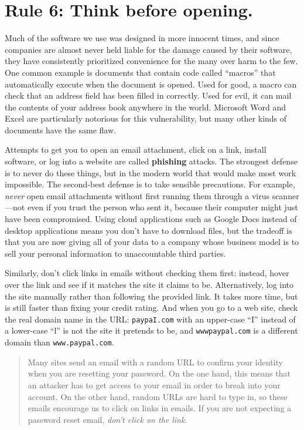 \documentclass[10pt,letterpaper]{article}
\newcommand{\rulemajor}[1]{\section*{#1}}
\begin{document}
\rulemajor{Rule 6: Think before opening.}

Much of the software we use was designed in more innocent times,
and since companies are almost never held liable for the damage caused by their software,
they have consistently prioritized convenience for the many over harm to the few.
One common example is documents that contain code called ``macros''
that automatically execute when the document is opened.
Used for good,
a macro can check that an address field has been filled in correctly.
Used for evil,
it can mail the contents of your address book anywhere in the world.
Microsoft Word and Excel are particularly notorious for this vulnerability,
but many other kinds of documents have the same flaw.

Attempts to get you to open an email attachment,
click on a link,
install software,
or log into a website are called \textbf{phishing} attacks.
The strongest defense is to never do these things,
but in the modern world that would make most work impossible.
The second-best defense is to take sensible precautions.
For example,
\emph{never} open email attachments without first running them through a virus scanner---not even
if you trust the person who sent it,
because their computer might just have been compromised.
Using cloud applications such as Google Docs instead of desktop applications means you don't have to download files,
but the tradeoff is that you are now giving all of your data to a company
whose business model is to sell your personal information to unaccountable third parties.

Similarly,
don't click links in emails without checking them first:
instead,
hover over the link and see if it matches the site it claims to be.
Alternatively,
log into the site manually rather than following the provided link.
It takes more time,
but is still faster than fixing your credit rating.
And when you go to a web site,
check the real domain name in the URL:
\texttt{paypaI.com} with an upper-case ``I'' instead of a lower-case ``l'' is not the site it pretends to be,
and \texttt{wwwpaypal.com} is a different domain than \texttt{www.paypal.com}.

\begin{quote}
  Many sites send an email with a random URL to confirm your identity when you are resetting your password.
  On the one hand,
  this means that an attacker has to get access to your email in order to break into your account.
  On the other hand,
  random URLs are hard to type in,
  so these emails encourage us to click on links in emails.
  If you are not expecting a password reset email,
  \emph{don't click on the link}.
\end{quote}
\end{document}
